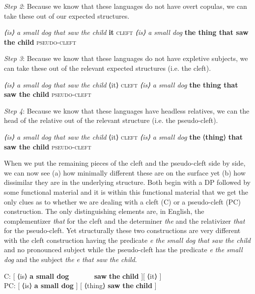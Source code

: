 \documentclass[output=paper]{langsci/langscibook}
\begin{document}
\textit{Step 2}:  Because we know that these languages do not have overt
copulas, we can take these out of our expected structures.

\ea
    \ea \emph{⟨is⟩ a small dog that saw the child } \textbf{it} \hfill \textsc{cleft}
    \ex \emph{⟨is⟩ a small dog} \textbf{the thing that saw the child} \hfill \textsc{pseudo-cleft}
    \z
\z

\textit{Step 3}:  Because we know that these languages do not have expletive
subjects, we can take these out of the relevant expected structures (i.e. the
cleft).

\ea
    \ea \emph{⟨is⟩ a small dog that saw the child } ⟨it⟩ \hfill \textsc{cleft}
    \ex \emph{⟨is⟩ a small dog} \textbf{the thing that saw the child} \hfill \textsc{pseudo-cleft}
    \z
\z

\textit{Step 4}:  Because we know that these languages have headless relatives,
we can the head of the relative out of the relevant structure (i.e. the
pseudo-cleft).

\ea\label{travis:14}
    \ea \emph{⟨is⟩ a small dog that saw the child } ⟨it⟩ \hfill \textsc{cleft}
    \ex \emph{⟨is⟩ a small dog} \textbf{the} ⟨\textbf{thing}⟩ \textbf{that saw the child}  \hfill \textsc{pseudo-cleft}
    \z
\z

When we put the remaining pieces of the cleft and the pseudo-cleft side by
side, we can now see (a) how minimally different these are on the surface yet
(b) how dissimilar they are in the underlying structure.  Both begin with a DP
followed by some functional material and it is within this functional material
that we get the only clues as to whether we are dealing with a cleft (C) or a
pseudo-cleft (PC) construction.  The only distinguishing elements are, in
English, the complementizer \emph{that} for the cleft  and the determiner
\emph{the} and the relativizer \emph{that} for the pseudo-cleft.  Yet
structurally these two constructions are very different with the cleft
construction having the predicate \emph{e the small dog that saw the child} and
no pronounced subject while the pseudo-cleft has the predicate \emph{e the
small dog} and the subject \emph{the e that saw the child}.

\ea\label{travis:15}
    \gll C: [ ⟨is⟩ \textbf{a small dog} ~ ~  ~ ~ \textbf{saw} \textbf{the} \textbf{child} ][ ⟨it⟩ ] \label{ex:littewords}\\
    PC:  [ ⟨is⟩ \textbf{a small dog} ] [  ⟨thing⟩  \textbf{saw} \textbf{the} \textbf{child} ] \\
\z
\end{document}
